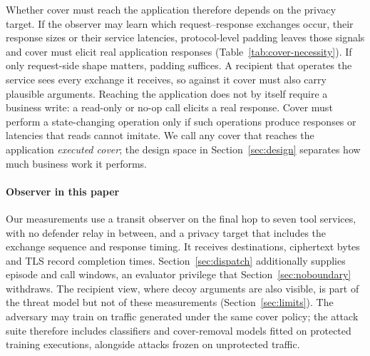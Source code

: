 Whether cover must reach the application therefore depends on the privacy target. If the observer may learn which request--response exchanges occur, their response sizes or their service latencies, protocol-level padding leaves those signals and cover must elicit real application responses (Table~\ref{tab:cover-necessity}). If only request-side shape matters, padding suffices. A recipient that operates the service sees every exchange it receives, so against it cover must also carry plausible arguments. Reaching the application does not by itself require a business write: a read-only or no-op call elicits a real response. Cover must perform a state-changing operation only if such operations produce responses or latencies that reads cannot imitate. We call any cover that reaches the application \emph{executed cover}; the design space in Section~\ref{sec:design} separates how much business work it performs.



\paragraph{Observer in this paper}
Our measurements use a transit observer on the final hop to seven tool services, with no defender relay in between, and a privacy target that includes the exchange sequence and response timing. It receives destinations, ciphertext bytes and TLS record completion times. Section~\ref{sec:dispatch} additionally supplies episode and call windows, an evaluator privilege that Section~\ref{sec:noboundary} withdraws. The recipient view, where decoy arguments are also visible, is part of the threat model but not of these measurements (Section~\ref{sec:limits}). The adversary may train on traffic generated under the same cover policy; the attack suite therefore includes classifiers and cover-removal models fitted on protected training executions, alongside attacks frozen on unprotected traffic.
